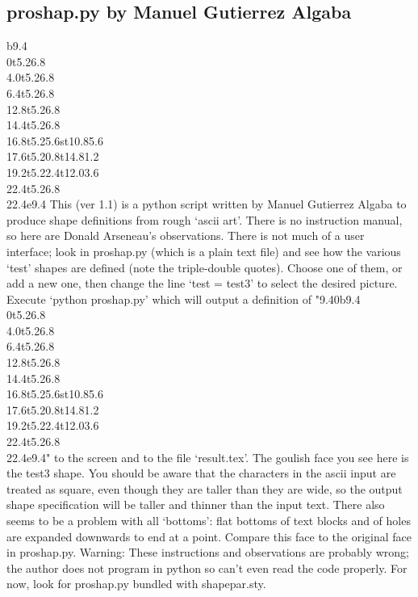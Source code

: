 \documentclass[draft]{article}
\begin{document}
\subsection{proshap.py by Man\-uel Gu\-ti\-er\-rez Al\-ga\-ba}
\begin{minipage}{0.2\textwidth}
\gdef\bassshape{{9.4}{0}b{9.4}
\\{0}t{5.2}{6.8}
\\{4.0}t{5.2}{6.8}
\\{6.4}t{5.2}{6.8}
\\{12.8}t{5.2}{6.8}
\\{14.4}t{5.2}{6.8}
\\{16.8}t{5.2}{5.6}st{10.8}{5.6}
\\{17.6}t{5.2}{0.8}t{14.8}{1.2}
\\{19.2}t{5.2}{2.4}t{12.0}{3.6}
\\{22.4}t{5.2}{6.8}
\\{22.4}e{9.4}}

\shapepar\bassshape
This (ver 1.1) is a python script written by Man\-uel
Gu\-ti\-er\-rez Al\-ga\-ba to produce shape definitions from rough
`ascii art'.  There is no instruction manual, so here are Donald
Arseneau's observations. There is not much of a user interface; look
in proshap.py (which is a plain text file) and see how the various
`test' shapes are defined (note the triple-double quotes).  Choose
one of them, or add a new one, then change the line `test = test3' to select
the desired picture.  Execute `python proshap.py' which will output a
definition of "\bassshape" to the screen and to the file `result.tex'.
The goul\-ish face you see here is the test3 shape.  You should be
aware that the characters in the ascii input are treated as square,
even though they are taller than they are wide, so the output shape
specification will be taller and thinner than the input text.  There
also seems to be a problem with all `bottoms': flat bottoms of text
blocks and of holes are expanded downwards to end at a point.  Compare
this face to the original face in proshap.py.  Warning: These
instructions and observations are probably wrong; the author does not
program in python so can't even read the code properly.  For now, look
for proshap.py bundled with shapepar.sty.
\end{minipage}
\end{document}
